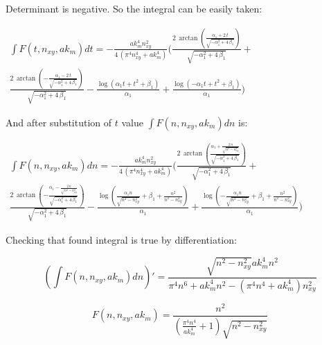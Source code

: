 \documentclass[11pt]{article}
\begin{document}
    Determinant is negative. So the integral can be easily taken:

    \(\begin{array}{r} \int F\left(t, n_{xy}, ak_m\right) dt = -\frac{\mathit{ak}_{m}^{4} n_{\mathit{xy}}^{2}}{4 \, {\left(\pi^{4} n_{\mathit{xy}}^{4} + \mathit{ak}_{m}^{4}\right)}} \Bigg(\frac{2 \, \arctan\left(\frac{\alpha_{1} + 2 \, t}{\sqrt{-\alpha_{1}^{2} + 4 \, \beta_{1}}}\right)}{\sqrt{-\alpha_{1}^{2} + 4 \, \beta_{1}}} + \\ \frac{2 \, \arctan\left(-\frac{\alpha_{1} - 2 \, t}{\sqrt{-\alpha_{1}^{2} + 4 \, \beta_{1}}}\right)}{\sqrt{-\alpha_{1}^{2} + 4 \, \beta_{1}}} - \frac{\log\left(\alpha_{1} t + t^{2} + \beta_{1}\right)}{\alpha_{1}} + \frac{\log\left(-\alpha_{1} t + t^{2} + \beta_{1}\right)}{\alpha_{1}}\Bigg) \end{array}\)

    And after substitution of \(t\) value
\(\int F\left(n, n_{xy}, ak_m\right) dn\) is:

    \(\begin{array}{r} \int F\left(n, n_{xy}, ak_m\right) dn = -\frac{\mathit{ak}_{m}^{4} n_{\mathit{xy}}^{2}}{4 \, {\left(\pi^{4} n_{\mathit{xy}}^{4} + \mathit{ak}_{m}^{4}\right)}} \Bigg(\frac{2 \, \arctan\left(\frac{\alpha_{1} + \frac{2 \, n}{\sqrt{n^{2} - n_{\mathit{xy}}^{2}}}}{\sqrt{-\alpha_{1}^{2} + 4 \, \beta_{1}}}\right)}{\sqrt{-\alpha_{1}^{2} + 4 \, \beta_{1}}} + \\ \frac{2 \, \arctan\left(-\frac{\alpha_{1} - \frac{2 \, n}{\sqrt{n^{2} - n_{\mathit{xy}}^{2}}}}{\sqrt{-\alpha_{1}^{2} + 4 \, \beta_{1}}}\right)}{\sqrt{-\alpha_{1}^{2} + 4 \, \beta_{1}}} - \frac{\log\left(\frac{\alpha_{1} n}{\sqrt{n^{2} - n_{\mathit{xy}}^{2}}} + \beta_{1} + \frac{n^{2}}{n^{2} - n_{\mathit{xy}}^{2}}\right)}{\alpha_{1}} + \frac{\log\left(-\frac{\alpha_{1} n}{\sqrt{n^{2} - n_{\mathit{xy}}^{2}}} + \beta_{1} + \frac{n^{2}}{n^{2} - n_{\mathit{xy}}^{2}}\right)}{\alpha_{1}}\Bigg) \end{array}\)

    Checking that found integral is true by differentiation:

    \[\left( \int F\left(n, n_{xy}, ak_m\right) dn \right)' = \frac{\sqrt{n^{2} - n_{\mathit{xy}}^{2}} \mathit{ak}_{m}^{4} n^{2}}{\pi^{4} n^{6} + \mathit{ak}_{m}^{4} n^{2} - {\left(\pi^{4} n^{4} + \mathit{ak}_{m}^{4}\right)} n_{\mathit{xy}}^{2}}\]

\[F\left(n, n_{xy}, ak_m\right)= \frac{n^{2}}{{\left(\frac{\pi^{4} n^{4}}{\mathit{ak}_{m}^{4}} + 1\right)} \sqrt{n^{2} - n_{\mathit{xy}}^{2}}}\]
\end{document}

